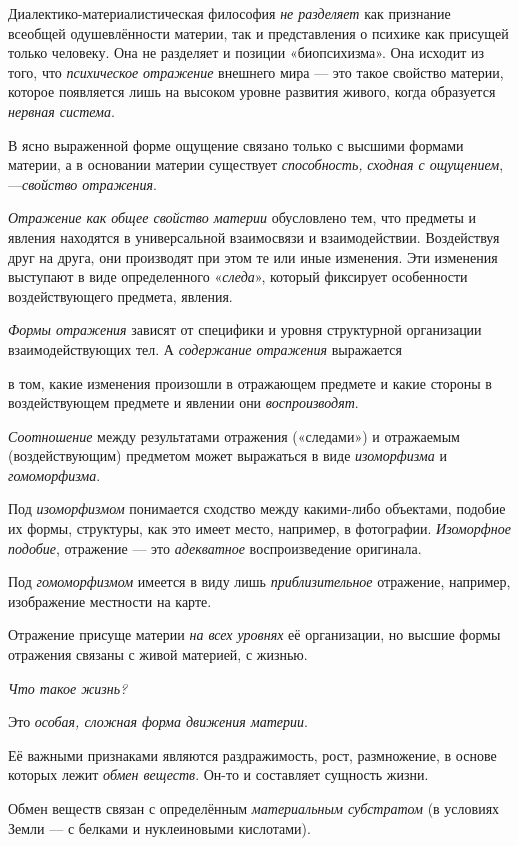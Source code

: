 \documentclass[a4paper,14pt,russian]{extreport}
\begin{document}
Диалектико-материалистическая философия \emph{не разделяет} как признание всеобщей одушевлённости материи, так и представления о психике как присущей только человеку. Она не разделяет и позиции «биопсихизма». Она исходит из того, что \emph{психическое отражение} внешнего мира --- это такое свойство материи, которое появляется лишь на высоком уровне развития живого, когда образуется \emph{нервная система}.

В ясно выраженной форме ощущение связано только с высшими формами материи, а в основании материи существует \emph{способность,} \emph{сходная с ощущением}, ---\emph{свойство отражения}.

\emph{Отражение как общее свойство материи} обусловлено тем, что предметы и явления находятся в универсальной взаимосвязи и взаимодействии. Воздействуя друг на друга, они производят при этом те или иные изменения. Эти изменения выступают в виде определенного «\emph{следа}», который фиксирует особенности воздействующего предмета, явления.

\emph{Формы отражения} зависят от специфики и уровня структурной организации взаимодействующих тел. А \emph{содержание отражения} выражается

в том, какие изменения произошли в отражающем предмете и какие стороны в воздействующем предмете и явлении они \emph{воспроизводят}.

\emph{Соотношение} между результатами отражения («следами») и отражаемым (воздействующим) предметом может выражаться в виде \emph{изоморфизма} и \emph{гомоморфизма}.

Под \emph{изоморфизмом} понимается сходство между какими-либо объектами, подобие их формы, структуры, как это имеет место, например, в фотографии. \emph{Изоморфное подобие}, отражение --- это \emph{адекватное} воспроизведение оригинала.

Под \emph{гомоморфизмом} имеется в виду лишь \emph{приблизительное} отражение, например, изображение местности на карте.

Отражение присуще материи \emph{на всех уровнях} её организации, но высшие формы отражения связаны с живой материей, с жизнью.

\emph{Что такое жизнь?}

Это \emph{особая, сложная форма движения материи}.

Её важными признаками являются раздражимость, рост, размножение, в основе которых лежит \emph{обмен веществ}. Он-то и составляет сущность жизни.

Обмен веществ связан с определённым \emph{материальным субстратом} (в условиях Земли --- с белками и нуклеиновыми кислотами).
\end{document}

